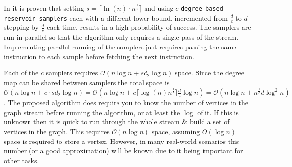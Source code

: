 \documentclass[11pt,twoside,a4paper]{report}
\begin{document}
\par In \cite{orig} it is proven that setting $s=\lceil\ln(n)\cdot n^{\frac1c}\rceil$ and using $c$ \texttt{degree-based reservoir samplers} each with a different lower bound, incremented from $\frac{d}c$ to $d$ stepping by $\frac{d}c$ each time, results in a high probability of success. The samplers are run in parallel so that the algorithm only requires a single pass of the stream. Implementing parallel running of the samplers just requires passing the same instruction to each sample before fetching the next instruction.

\par Each of the $c$ samplers requires $\mathcal{O}(n\log n+sd_2\log n)$ space. Since the degree map can be shared between samplers the total space is $\mathcal{O}(n\log n+c\cdot sd_2\log n)=\mathcal{O}(n\log n+c\lceil\log(n)n^{\frac1c}\rceil\frac{d}c\log n)=\mathcal{O}(n\log n+n^{\frac1c}d\log^2n)$. The proposed algorithm does require you to know the number of vertices in the graph stream before running the algorithm, or at least the $\log$ of it. If this is unknown then it is quick to run through the whole stream \& build a set of vertices in the graph. This requires $\mathcal{O}(n\log n)$ space, assuming $O(\log n)$ space is required to store a vertex. However, in many real-world scenarios this number (or a good approximation) will be known due to it being important for other tasks.
\end{document}

